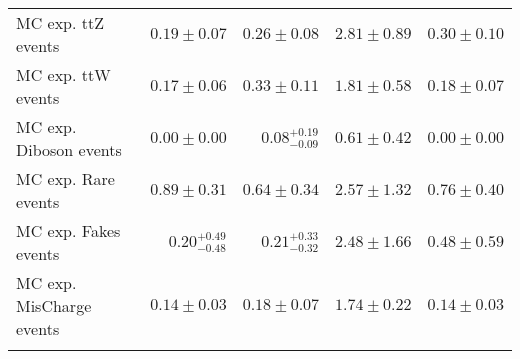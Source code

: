 \begin{tabular*}{\textwidth}{@{\extracolsep{\fill}}lrrrr}
\noalign{\smallskip}\hline\noalign{\smallskip}


        MC exp. ttZ events         & $0.19 \pm 0.07$    & $0.26 \pm 0.08$   & $2.81 \pm 0.89$   & $0.30 \pm 0.10$  \\


        MC exp. ttW events         & $0.17 \pm 0.06$    & $0.33 \pm 0.11$   & $1.81 \pm 0.58$   & $0.18 \pm 0.07$  \\


        MC exp. Diboson events         & $0.00 \pm 0.00$    & $0.08_{-0.09}^{+0.19}$   & $0.61 \pm 0.42$   & $0.00 \pm 0.00$  \\


        MC exp. Rare events         & $0.89 \pm 0.31$    & $0.64 \pm 0.34$   & $2.57 \pm 1.32$   & $0.76 \pm 0.40$  \\


        MC exp. Fakes events         & $0.20_{-0.48}^{+0.49}$    & $0.21_{-0.32}^{+0.33}$   & $2.48 \pm 1.66$   & $0.48 \pm 0.59$  \\


        MC exp. MisCharge events         & $0.14 \pm 0.03$    & $0.18 \pm 0.07$   & $1.74 \pm 0.22$   & $0.14 \pm 0.03$  \\


\noalign{\smallskip}\hline\noalign{\smallskip}

\end{tabular*}
